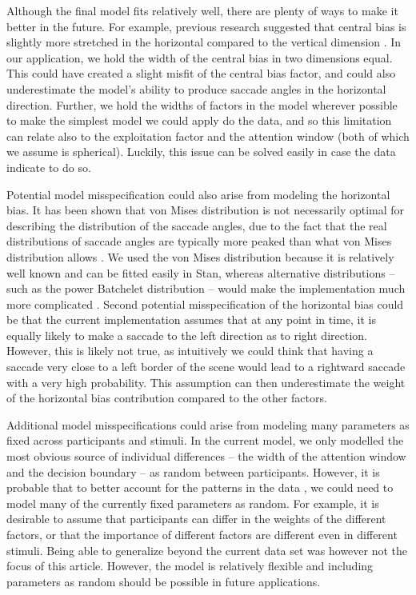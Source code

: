 \documentclass{article}
\begin{document}
Although the final model fits relatively well, there are plenty of ways to make it better in the future. For example, previous research suggested that central bias is slightly more stretched in the horizontal compared to the vertical dimension \citep{tatler2007central}. In our application, we hold the width of the central bias in two dimensions equal. This could have created a slight misfit of the central bias factor, and could also underestimate the model's ability to produce saccade angles in the horizontal direction. Further, we hold the widths of factors in the model wherever possible to make the simplest model we could apply do the data, and so this limitation can relate also to the exploitation factor and the attention window (both of which we assume is spherical). Luckily, this issue can be solved easily in case the data indicate to do so.

Potential model misspecification could also arise from modeling the horizontal bias. It has been shown that von Mises distribution is not necessarily optimal for describing the distribution of the saccade angles, due to the fact that the real distributions of saccade angles are typically more peaked than what von Mises distribution allows \citep{mulder2020mixtures}. We used the von Mises distribution because it is relatively well known and can be fitted easily in Stan, whereas alternative distributions -- such as the power Batchelet distribution -- would make the implementation much more complicated \citep{mulder2020mixtures}. Second potential misspecification of the horizontal bias could be that the current implementation assumes that at any point in time, it is equally likely to make a saccade to the left direction as to right direction. However, this is likely not true, as intuitively we could think that having a saccade very close to a left border of the scene would lead to a rightward saccade with a very high probability. This assumption can then underestimate the weight of the horizontal bias contribution compared to the other factors. 

Additional model misspecifications could arise from modeling many parameters as fixed across participants and stimuli. In the current model, we only modelled the most obvious source of individual differences -- the width of the attention window and the decision boundary -- as random between participants. However, it is probable that to better account for the patterns in the data \citep[and to justify generalizibility to a population of observers and a population of stimuli; ][]{yarkoni2019generalizability}, we could need to model many of the currently fixed parameters as random. For example, it is desirable to assume that participants can differ in the weights of the different factors, or that the importance of different factors are different even in different stimuli. Being able to generalize beyond the current data set was however not the focus of this article. However, the model is relatively flexible and including parameters as random should be possible in future applications.
\end{document}
